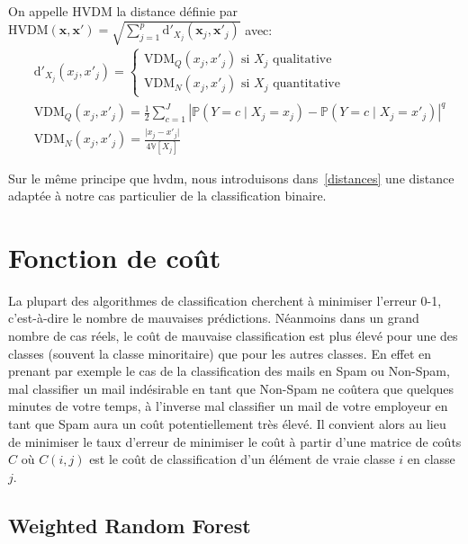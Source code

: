 \begin{definition}
    On appelle $\mathrm{HVDM}$ la distance définie par $\mathrm{HVDM} (\mathbf{x},\mathbf{x}') = \sqrt{ \sum_{j=1}^p \mathrm{d}'_{X_j} (\mathbf{x}_j,\mathbf{x}'_j) }$ avec:
    \begin{align*}
        &\mathrm{d}'_{X_j} (x_j,x'_j) = \begin{cases}
            \mathrm{VDM}_Q (x_j,x'_j) \text{ si } X_j \text{ qualitative} \\
            \mathrm{VDM}_N (x_j,x'_j) \text{ si } X_j \text{ quantitative}
        \end{cases}\\
        &\mathrm{VDM}_Q (x_j,x'_j) = \frac{1}{2} \sum_{c=1}^J \left\vert \mathbb{P} \left( Y = c \mid X_j = x_j \right) - \mathbb{P} \left( Y = c \mid X_j = x'_j \right) \right\vert^q \\
        &\mathrm{VDM}_N (x_j,x'_j) = \frac{ \vert x_j - x'_j \vert }{4 \mathbb{V} \left[ X_j \right]}
    \end{align*}
\end{definition}

Sur le même principe que \ac{hvdm}, nous introduisons dans~\ref{distances} une distance adaptée à notre cas particulier de la classification binaire.

\section{Fonction de coût}

La plupart des algorithmes de classification cherchent à minimiser l'erreur 0-1, c'est-à-dire le nombre de mauvaises prédictions. Néanmoins dans un grand nombre de cas réels, le coût de mauvaise classification est plus élevé pour une des classes (souvent la classe minoritaire) que pour les autres classes. En effet en prenant par exemple le cas de la classification des mails en Spam ou Non-Spam, mal classifier un mail indésirable en tant que Non-Spam ne coûtera que quelques minutes de votre temps, à l'inverse mal classifier un mail de votre employeur en tant que Spam aura un coût potentiellement très élevé. Il convient alors au lieu de minimiser le taux d'erreur de minimiser le coût à partir d'une matrice de coûts $C$ où $C(i,j)$ est le coût de classification d'un élément de vraie classe $i$ en classe $j$.

\subsection{Weighted Random Forest}

